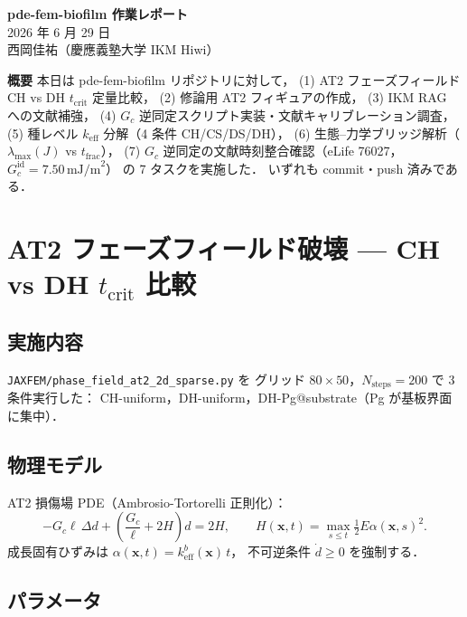 \documentclass[12pt, a4paper]{article}
\begin{document}
\begin{center}
  {\LARGE\bfseries pde-fem-biofilm 作業レポート}\\[0.6em]
  {\large 2026 年 6 月 29 日}\\[0.3em]
  {\normalsize 西岡佳祐（慶應義塾大学 IKM Hiwi）}
\end{center}

\vspace{0.8em}
\noindent\textbf{概要}\quad
本日は pde-fem-biofilm リポジトリに対して，
(1) AT2 フェーズフィールド CH vs DH $t_\mathrm{crit}$ 定量比較，
(2) 修論用 AT2 フィギュアの作成，
(3) IKM RAG への文献補強，
(4) $G_c$ 逆同定スクリプト実装・文献キャリブレーション調査，
(5) 種レベル $k_\mathrm{eff}$ 分解（4 条件 CH/CS/DS/DH），
(6) 生態–力学ブリッジ解析（$\lambda_\mathrm{max}(J)$ vs $t_\mathrm{frac}$），
(7) $G_c$ 逆同定の文献時刻整合確認（eLife 76027，$G_c^\mathrm{id}=7.50\,\mathrm{mJ/m}^2$）
の 7 タスクを実施した．
いずれも commit・push 済みである．

\section{AT2 フェーズフィールド破壊 — CH vs DH $t_\mathrm{crit}$ 比較}

\subsection{実施内容}

\texttt{JAXFEM/phase\_field\_at2\_2d\_sparse.py} を
グリッド $80 \times 50$，$N_\mathrm{steps} = 200$ で 3 条件実行した：
CH-uniform，DH-uniform，DH-Pg@substrate（Pg が基板界面に集中）．

\subsection{物理モデル}

AT2 損傷場 PDE（Ambrosio-Tortorelli 正則化）：
\begin{equation}
  -G_c \ell \,\Delta d
  + \!\left(\frac{G_c}{\ell} + 2H\right)d
  = 2H,
  \qquad
  H(\mathbf{x},t)
  = \max_{s \le t} \tfrac{1}{2} E \alpha(\mathbf{x},s)^2.
\end{equation}
成長固有ひずみは $\alpha(\mathbf{x},t) = k_{\mathrm{eff}}^b(\mathbf{x})\,t$，
不可逆条件 $\dot{d} \ge 0$ を強制する．

\subsection{パラメータ}
\end{document}
